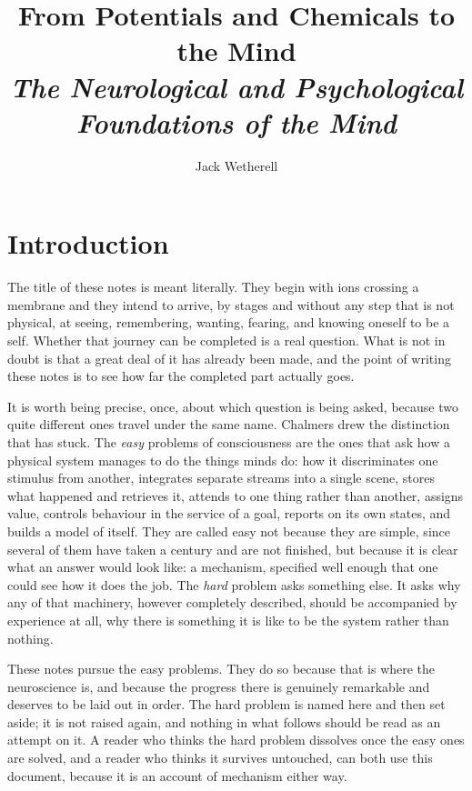 \documentclass[11pt]{article}
\title{\textbf{From Potentials and Chemicals to the Mind} \\
\large \textit{The Neurological and Psychological Foundations of the Mind}}
\author{Jack Wetherell}
\date{}
\begin{document}
\maketitle
\tableofcontents
\newpage

\section*{Introduction}

The title of these notes is meant literally. They begin with ions crossing a membrane and they intend to arrive, by stages and without any step that is not physical, at seeing, remembering, wanting, fearing, and knowing oneself to be a self. Whether that journey can be completed is a real question. What is not in doubt is that a great deal of it has already been made, and the point of writing these notes is to see how far the completed part actually goes.

It is worth being precise, once, about which question is being asked, because two quite different ones travel under the same name. Chalmers drew the distinction that has stuck. The \textit{easy} problems of consciousness are the ones that ask how a physical system manages to do the things minds do: how it discriminates one stimulus from another, integrates separate streams into a single scene, stores what happened and retrieves it, attends to one thing rather than another, assigns value, controls behaviour in the service of a goal, reports on its own states, and builds a model of itself. They are called easy not because they are simple, since several of them have taken a century and are not finished, but because it is clear what an answer would look like: a mechanism, specified well enough that one could see how it does the job. The \textit{hard} problem asks something else. It asks why any of that machinery, however completely described, should be accompanied by experience at all, why there is something it is like to be the system rather than nothing.

These notes pursue the easy problems. They do so because that is where the neuroscience is, and because the progress there is genuinely remarkable and deserves to be laid out in order. The hard problem is named here and then set aside; it is not raised again, and nothing in what follows should be read as an attempt on it. A reader who thinks the hard problem dissolves once the easy ones are solved, and a reader who thinks it survives untouched, can both use this document, because it is an account of mechanism either way.
\end{document}

